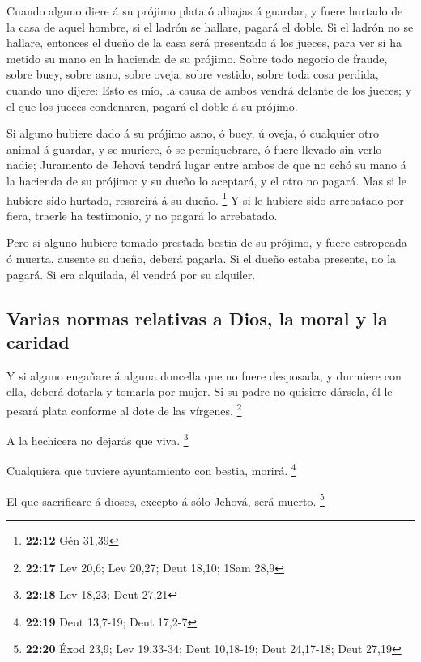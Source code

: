  Cuando alguno diere á su prójimo plata ó alhajas á guardar,
y fuere hurtado de la casa de aquel hombre, si el ladrón se hallare,
pagará el doble.  Si el ladrón no se hallare, entonces el
dueño de la casa será presentado á los jueces, para ver si ha metido su
mano en la hacienda de su prójimo.  Sobre todo negocio de
fraude, sobre buey, sobre asno, sobre oveja, sobre vestido, sobre toda
cosa perdida, cuando uno dijere: Esto es mío, la causa de ambos vendrá
delante de los jueces; y el que los jueces condenaren, pagará el doble á
su prójimo.

 Si alguno hubiere dado á su prójimo asno, ó buey, ú oveja,
ó cualquier otro animal á guardar, y se muriere, ó se perniquebrare, ó
fuere llevado sin verlo nadie;  Juramento de Jehová tendrá
lugar entre ambos de que no echó su mano á la hacienda de su prójimo: y
su dueño lo aceptará, y el otro no pagará.  Mas si le
hubiere sido hurtado, resarcirá á su dueño. \footnote{\textbf{22:12} Gén
  31,39}  Y si le hubiere sido arrebatado por fiera,
traerle ha testimonio, y no pagará lo arrebatado.

 Pero si alguno hubiere tomado prestada bestia de su
prójimo, y fuere estropeada ó muerta, ausente su dueño, deberá pagarla.
 Si el dueño estaba presente, no la pagará. Si era
alquilada, él vendrá por su alquiler.

\hypertarget{varias-normas-relativas-a-dios-la-moral-y-la-caridad}{%
\subsection{Varias normas relativas a Dios, la moral y la
caridad}\label{varias-normas-relativas-a-dios-la-moral-y-la-caridad}}

 Y si alguno engañare á alguna doncella que no fuere
desposada, y durmiere con ella, deberá dotarla y tomarla por mujer.
 Si su padre no quisiere dársela, él le pesará plata
conforme al dote de las vírgenes. \footnote{\textbf{22:17} Lev 20,6; Lev
  20,27; Deut 18,10; 1Sam 28,9}

 A la hechicera no dejarás que viva. \footnote{\textbf{22:18}
  Lev 18,23; Deut 27,21}

 Cualquiera que tuviere ayuntamiento con bestia, morirá.
\footnote{\textbf{22:19} Deut 13,7-19; Deut 17,2-7}

 El que sacrificare á dioses, excepto á sólo Jehová, será
muerto. \footnote{\textbf{22:20} Éxod 23,9; Lev 19,33-34; Deut 10,18-19;
  Deut 24,17-18; Deut 27,19}

